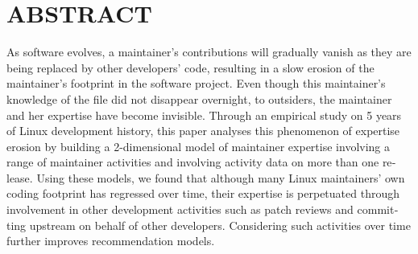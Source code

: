 %

\chapter*{ABSTRACT}\thispagestyle{headings}
%
\begin{otherlanguage}{english}



As software evolves, a maintainer's contributions will gradually vanish as they are being replaced by other developers' code, resulting in a slow erosion of the maintainer's footprint in the software project. Even though this maintainer's knowledge of the file did not disappear overnight, to outsiders, the maintainer and her expertise have become invisible. Through an empirical study on 5 years of Linux development history, this paper analyses this phenomenon of expertise erosion by building a 2-dimensional model of maintainer expertise involving a range of maintainer activities and involving activity data on more than one release. Using these models, we found that although many Linux maintainers' own coding footprint has regressed over time, their expertise is perpetuated through involvement in other development activities such as patch reviews and committing upstream on behalf of other developers. Considering such activities over time further improves recommendation models.

\end{otherlanguage}
